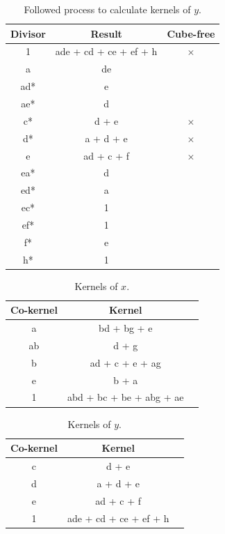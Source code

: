 \documentclass[a4paper, 10pt]{article}
\begin{document}
\begin{table}[hbtp]
    \centering
    \begin{tabular}{|c c | c |}
        \hline
        Divisor & Result        & Cube-free \\ \hline
        1       & ade + cd + ce + ef + h & $\times$ \\
        a       & de  & \\
        ad*     & e & \\
        ae*     & d & \\
        c*      & d + e & $\times$ \\
        d*      & a + d + e & $\times$ \\
        e       & ad + c + f & $\times$ \\
        ea*     & d & \\
        ed*     & a & \\
        ec*     & 1 & \\
        ef*     & 1 & \\
        f*      & e & \\
        h*      & 1 & \\
         \hline
    \end{tabular}
    \caption{Followed process to calculate kernels of $y$.}
    \label{tab:y_process}
\end{table}

\begin{table}[hbtp]
    \centering
    \begin{tabular}{|c c | c |}
        \hline
        Co-kernel & Kernel       \\ \hline
        a       &  bd + bg + e  \\
        ab      &  d + g \\
        b       &  ad + c + e + ag \\
        e       &  b + a \\
        1       & abd + bc + be + abg + ae \\
         \hline
    \end{tabular}
    \caption{Kernels of $x$.}
    \label{tab:x_kernels}
\end{table}

\begin{table}[hbtp]
    \centering
    \begin{tabular}{|c c | c |}
        \hline
        Co-kernel & Kernel \\ \hline
        c       & d + e\\
        d       & a + d + e\\
        e       & ad + c + f\\
        1       & ade + cd + ce + ef + h\\
         \hline
    \end{tabular}
    \caption{Kernels of $y$.}
    \label{tab:y_kernels}
\end{table}
\end{document}
